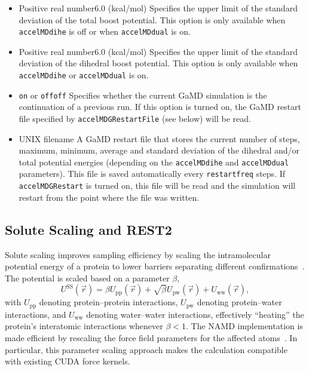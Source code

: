 \begin{itemize}
\item
{}
{Positive real number}{6.0 (kcal/mol)}
{Specifies the upper limit of the standard deviation of the total boost potential. This option is only available when {\tt accelMDdihe} is off or when {\tt accelMDdual} is on.
}

\item
{}
{Positive real number}{6.0 (kcal/mol)}
{Specifies the upper limit of the standard deviation of the dihedral boost potential. This option is only available when {\tt accelMDdihe} or {\tt accelMDdual} is on.
}

\item
{}
{{\tt on} or {\tt off}}{{\tt off}}
{Specifies whether the current GaMD simulation is the continuation of a previous run. If this option is turned on, the GaMD restart file specified by {\tt accelMDGRestartFile} (see below) will be read. 
}

\item
{}
{UNIX filename}
{A GaMD restart file that stores the current number of steps, maximum, minimum, average and standard deviation of the dihedral and/or total potential energies (depending on the {\tt accelMDdihe} and {\tt accelMDdual} parameters). This file is saved automatically every {\tt restartfreq} steps. If {\tt accelMDGRestart} is turned on, this file will be read and the simulation will restart from the point where the file was written.
}

\end{itemize}


\subsection{Solute Scaling and REST2}
\label{section:rest2}

Solute scaling improves sampling efficiency
by scaling the intramolecular potential energy of a protein
to lower barriers separating different confirmations~\cite{WANG2011E}.
The potential is scaled based on a parameter $\beta$,
\begin{equation}
U^{\text{SS}}(\vec{r}) =
\beta U_{\text{pp}}(\vec{r}) +
\sqrt{\beta} U_{\text{pw}}(\vec{r}) +
U_{\text{ww}}(\vec{r}),
\end{equation}
with $U_{\text{pp}}$ denoting protein--protein interactions,
$U_{\text{pw}}$ denoting protein--water interactions,
and $U_{\text{ww}}$ denoting water--water interactions,
effectively ``heating'' the protein's interatomic interactions
whenever $\beta < 1$.
The NAMD implementation is made efficient by rescaling
the force field parameters for the affected atoms~\cite{JO2015}.
In particular, this parameter scaling approach makes the calculation
compatible with existing CUDA force kernels.

